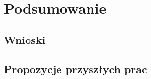 \chapter{Podsumowanie}
\label{cha:podsumowanie}
\section{Wnioski}
\section{Propozycje przyszłych prac}